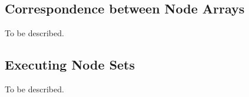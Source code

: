 \subsection{Correspondence between Node Arrays}

To be described.

\subsection{Executing Node Sets}

To be described.
